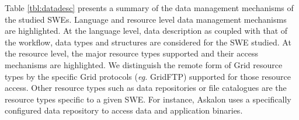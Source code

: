 Table \ref{tbl:datadesc} presents a summary of the data management mechanisms
of the studied SWEs. Language and resource level data management mechanisms are
highlighted. At the language level, data description as coupled with that of
the workflow, data types and structures are considered for the SWE studied. At
the resource level, the major resource types supported and their access
mechanisms are highlighted. We distinguish the remote form of Grid resource
types by the specific Grid protocols (\textit{eg.} GridFTP) supported for those
resource access. Other resource types such as data repositories or file
catalogues are the resource types specific to a given SWE. For instance,
Askalon uses a specifically configured data repository to access data and
application binaries.


